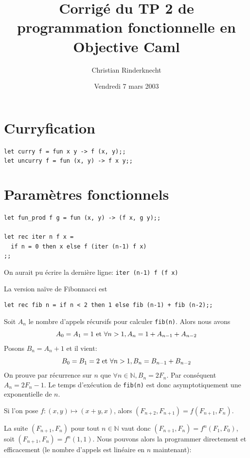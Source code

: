 \documentclass[11pt, a4paper]{article}
\title{Corrigé du TP 2 de programmation fonctionnelle en Objective Caml}
\author{Christian Rinderknecht}
\date{Vendredi 7 mars 2003}
\begin{document}
\maketitle

\section{Curryfication}

\begin{verbatim}
let curry f = fun x y -> f (x, y);;
let uncurry f = fun (x, y) -> f x y;;
\end{verbatim}


\section{Paramètres fonctionnels}

\begin{verbatim}
let fun_prod f g = fun (x, y) -> (f x, g y);;

let rec iter n f x =
  if n = 0 then x else f (iter (n-1) f x)
;;
\end{verbatim}

\noindent On aurait pu écrire la dernière ligne:
\verb|iter (n-1) f (f x)|

\medskip

\noindent La version naïve de Fibonnacci est
\begin{verbatim}
let rec fib n = if n < 2 then 1 else fib (n-1) + fib (n-2);;
\end{verbatim}

\noindent Soit $A_n$ le nombre d'appels récursifs pour calculer
\texttt{fib(n)}. Alors nous avons
$$A_0 = A_1 = 1 \ \textnormal{et} \ \forall n > 1, A_n = 1 + A_{n-1} +
A_{n-2}$$
Posons $B_n = A_n + 1$ et il vient:
$$ B_0 = B_1 = 2 \ \textnormal{et} \ \forall n > 1, B_n = B_{n-1} +
B_{n-2} $$
On prouve par récurrence sur $n$ que $\forall n \in \mathbb{N}, B_n =
2 F_n$. Par conséquent $A_n = 2 F_n - 1$. Le temps d'exécution de
\texttt{fib(n)} est donc asymptotiquement une exponentielle de $n$.

\medskip

\noindent
Si l'on pose $f : (x,y) \mapsto (x+y,x)$, alors $(F_{n+2},F_{n+1}) = f
(F_{n+1},F_{n})$.

\medskip

\noindent
La suite $(F_{n+1},F_{n})$ pour tout $n \in \mathbb{N}$ vaut donc
$(F_{n+1},F_{n}) = f^{n}(F_1,F_0)$, soit $(F_{n+1},F_{n}) =
f^{n}(1,1)$. Nous pouvons alors la programmer directement et
efficacement (le nombre d'appels est linéaire en $n$ maintenant):
\end{document}
